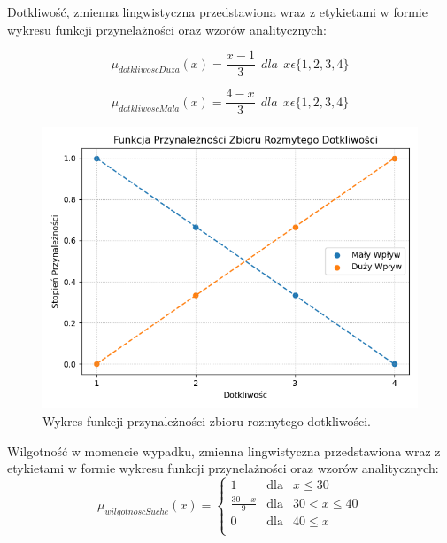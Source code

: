 \documentclass{classrep}
\begin{document}
Dotkliwość, zmienna lingwistyczna przedstawiona wraz z etykietami w formie wykresu funkcji przynelażności oraz wzorów analitycznych:

\begin{equation}
\mu _{dotkliwoscDuza}(x) =  \frac{x - 1}{3} \ \ dla \ \  x\epsilon \{1, 2, 3, 4\}
\end{equation}

\begin{equation}
\mu _{dotkliwoscMala}(x) =  \frac{4 - x}{3} \ \ dla \ \  x\epsilon \{1, 2, 3, 4\}
\end{equation}

\begin{figure}[h!]
 \centering
 \includegraphics[width=14cm]{FunkcjaPrzynaleznosciDotkliwosc.png}
 \vspace{-0.3cm}
 \caption{Wykres funkcji przynależności zbioru rozmytego dotkliwości. }
 \label{rysunek do eksperymentu 1 wariantu 1}
\end{figure}
\newpage




Wilgotność w momencie wypadku, zmienna lingwistyczna przedstawiona wraz z etykietami w formie wykresu funkcji przynelażności oraz wzorów analitycznych:
\begin{equation}
\mu _{wilgotnoscSuche}(x) =  \left\{ \begin{array}{rcl}
 1 & \mbox{dla} & x  \leq 30 \\
\frac{30 - x}{9} & \mbox{dla} & 30 < x \leq 40\\
0 & \mbox{dla} & 40 \leq x\\
\end{array}\right.
\end{equation}
\end{document}
